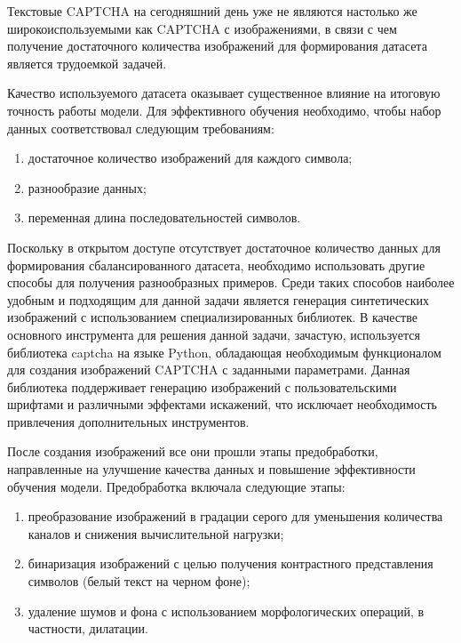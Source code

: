 \documentclass{altsu-report}
\begin{document}
Текстовые CAPTCHA на сегодняшний день уже не являются настолько же 
широкоиспользуемыми как CAPTCHA с изображениями, в связи с чем получение 
достаточного количества изображений для формирования датасета является трудоемкой 
задачей.

Качество используемого датасета оказывает существенное влияние на итоговую 
точность работы модели. Для эффективного обучения необходимо, чтобы набор данных 
соответствовал следующим требованиям:

\begin{enumerate}
    \item достаточное количество изображений для каждого символа;
    \item разнообразие данных;
    \item переменная длина последовательностей символов.
\end{enumerate}

Поскольку в открытом доступе отсутствует достаточное количество данных для 
формирования сбалансированного датасета, необходимо использовать другие способы 
для получения разнообразных примеров. Среди таких способов наиболее удобным и 
подходящим для данной задачи является генерация синтетических изображений с 
использованием специализированных библиотек. В качестве основного инструмента 
для решения данной задачи, зачастую, используется библиотека captcha на языке 
Python, обладающая необходимым функционалом для создания изображений CAPTCHA с 
заданными параметрами. Данная библиотека поддерживает генерацию изображений с 
пользовательскими шрифтами и различными эффектами искажений, что исключает 
необходимость привлечения дополнительных инструментов.

После создания изображений все они прошли этапы предобработки, направленные на 
улучшение качества данных и повышение эффективности обучения модели. 
Предобработка включала следующие этапы:

\begin{enumerate}
    \item преобразование изображений в градации серого для уменьшения количества 
    каналов и снижения вычислительной нагрузки;
    \item бинаризация изображений с целью получения контрастного представления 
    символов (белый текст на черном фоне);
    \item удаление шумов и фона с использованием морфологических операций, в 
    частности, дилатации.
\end{enumerate}
\end{document}
